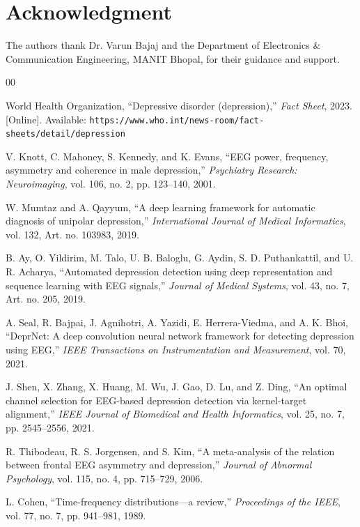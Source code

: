 \documentclass[conference]{IEEEtran}
\begin{document}
\section*{Acknowledgment}
The authors thank Dr. Varun Bajaj and the Department of Electronics
\& Communication Engineering, MANIT Bhopal, for their guidance and
support.

\begin{thebibliography}{00}

World Health Organization, ``Depressive disorder (depression),''
\textit{Fact Sheet}, 2023. [Online]. Available:
\texttt{https://www.who.int/news-room/fact-sheets/detail/depression}

V. Knott, C. Mahoney, S. Kennedy, and K. Evans, ``EEG power,
frequency, asymmetry and coherence in male depression,''
\textit{Psychiatry Research: Neuroimaging}, vol. 106, no. 2,
pp. 123--140, 2001.

W. Mumtaz and A. Qayyum, ``A deep learning framework for automatic
diagnosis of unipolar depression,'' \textit{International Journal of
Medical Informatics}, vol. 132, Art. no. 103983, 2019.

B. Ay, O. Yildirim, M. Talo, U. B. Baloglu, G. Aydin,
S. D. Puthankattil, and U. R. Acharya, ``Automated depression
detection using deep representation and sequence learning with EEG
signals,'' \textit{Journal of Medical Systems}, vol. 43, no. 7,
Art. no. 205, 2019.

A. Seal, R. Bajpai, J. Agnihotri, A. Yazidi, E. Herrera-Viedma, and
A. K. Bhoi, ``DeprNet: A deep convolution neural network framework
for detecting depression using EEG,''
\textit{IEEE Transactions on Instrumentation and Measurement},
vol. 70, 2021.

J. Shen, X. Zhang, X. Huang, M. Wu, J. Gao, D. Lu, and Z. Ding,
``An optimal channel selection for EEG-based depression detection via
kernel-target alignment,'' \textit{IEEE Journal of Biomedical and
Health Informatics}, vol. 25, no. 7, pp. 2545--2556, 2021.

R. Thibodeau, R. S. Jorgensen, and S. Kim, ``A meta-analysis of the
relation between frontal EEG asymmetry and depression,''
\textit{Journal of Abnormal Psychology}, vol. 115, no. 4,
pp. 715--729, 2006.

L. Cohen, ``Time-frequency distributions---a review,''
\textit{Proceedings of the IEEE}, vol. 77, no. 7, pp. 941--981, 1989.


\end{thebibliography}
\end{document}
